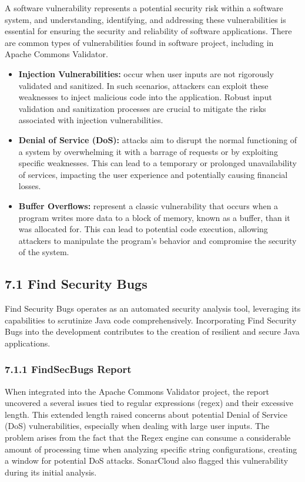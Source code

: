 \documentclass{sigchi}
\begin{document}
A software vulnerability represents a potential security risk within a software system, and understanding, identifying, and addressing these vulnerabilities is essential for ensuring the security and reliability of software applications. 
There are common types of vulnerabilities found in software project, including in Apache Commons Validator.
\begin{itemize}
    \item \textbf{Injection Vulnerabilities:} occur when user inputs are not rigorously validated and sanitized. In such scenarios, attackers can exploit these weaknesses to inject malicious code into the application. Robust input validation and sanitization processes are crucial to mitigate the risks associated with injection vulnerabilities.
    \item \textbf{Denial of Service (DoS):} attacks aim to disrupt the normal functioning of a system by overwhelming it with a barrage of requests or by exploiting specific weaknesses. This can lead to a temporary or prolonged unavailability of services, impacting the user experience and potentially causing financial losses.
    \item \textbf{Buffer Overflows:} represent a classic vulnerability that occurs when a program writes more data to a block of memory, known as a buffer, than it was allocated for. This can lead to potential code execution, allowing attackers to manipulate the program's behavior and compromise the security of the system. 
\end{itemize}

\subsection{7.1 Find Security Bugs}
Find Security Bugs \cite{findsecbugs} operates as an automated security analysis tool, leveraging its capabilities to scrutinize Java code comprehensively. Incorporating Find Security Bugs into the development contributes to the creation of resilient and secure Java applications.

\subsubsection{\textbf{7.1.1 FindSecBugs Report}}
When integrated into the Apache Commons Validator project, the report uncovered a several issues tied to regular expressions (regex) and their excessive length. This extended length raised concerns about potential Denial of Service (DoS) vulnerabilities, especially when dealing with large user inputs. The problem arises from the fact that the Regex engine can consume a considerable amount of processing time when analyzing specific string configurations, creating a window for potential DoS attacks. SonarCloud also flagged this vulnerability during its initial analysis.
\end{document}
